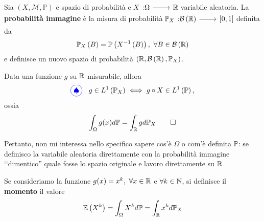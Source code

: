 \begin{define}
	Sia $\left(X,\mathcal{M},\mathbb{P}\right)$ e spazio di probabilità e $\funz{X}{\Omega}{\realset}$ variabile aleatoria.
	La \textbf{probabilità immagine} è la misura di probabilità $\funz{\mathbb{P}_X}{\mathcal{B}\left(\realset\right)}{\left[0,1\right]}$ definita da
	\begin{equation}
		\mathbb{P}_X\left(B\right)=\mathbb{P}\left(X^{-1}\left(B\right)\right),\ \forall B\in \mathcal{B\left(\realset\right)}
	\end{equation}
	e definisce un nuovo spazio di probabilità $\left(\mathbb{R},\mathcal{B}\left(\mathbb{R}\right),\mathbb{P}_X\right)$.
\end{define}
\begin{theoremaqed}
	Data una funzione $g$ su $\mathbb{R}$ misurabile, allora
	\begin{equation}
		\circled[blue]{\spadesuit}\quad g\in L^{1}\left(\mathbb{P}_X\right)\iff g\circ X\in L^{1}\left(\mathbb{P}\right),
	\end{equation}
	ossia
	\begin{equation}
		\int_{\Omega}g(x)d\mathbb{P}=\int_{\mathbb{R}}gd\mathbb{P}_X\qedhere
	\end{equation}
\end{theoremaqed}
Pertanto, non mi interessa nello specifico sapere cos'è $\Omega$ o com'è definita $\mathbb{P}$: se definisco la variabile aleatoria direttamente con la probabilità immagine ‘‘dimentico'' quale fosse lo spazio originale e lavoro direttamente su $\mathbb{R}$
\begin{define}
	Se consideriamo la funzione $g(x)=x^k,\ \forall x\in\realset$ e $\forall k\in\mathbb{N}$, si definisce il \textbf{momento} il valore
	\begin{equation*}
		\mathbb{E}\left(X^k\right)=\int_{\Omega}X^kd\mathbb{P}=\int_{\mathbb{R}}x^kd\mathbb{P}_X
	\end{equation*}
\end{define}
